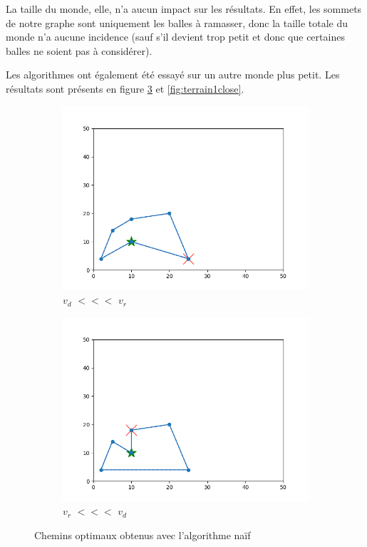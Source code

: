 \documentclass[12pt]{article}
\begin{document}
    \bigskip

    La taille du monde, elle, n'a aucun impact sur les résultats. En effet, les sommets de notre graphe sont uniquement les balles à ramasser, donc la taille totale du monde n'a aucune incidence (sauf s'il devient trop petit et donc que certaines balles ne soient pas à considérer).

    Les algorithmes ont également été essayé sur un autre monde plus petit. Les résultats sont présents en figure \ref{fig:terrain1opt} et \ref{fig:terrain1close}.

    \begin{figure}[H]
      \centering
      \begin{subfigure}{0.35\textwidth}
        \centering
        \includegraphics[width=\linewidth]{img/1od}
        \caption{$v_d$ $<<<$ $v_r$}
        \label{subfig:terrain3mvt}
      \end{subfigure}
      \hfill
      \begin{subfigure}{0.35\textwidth}
        \centering
        \includegraphics[width=\linewidth]{img/1or}
        \caption{$v_r$ $<<<$ $v_d$}
        \label{subfig:terrain3rot}
      \end{subfigure}
      \caption{Chemins optimaux obtenus avec l'algorithme naïf}
      \label{fig:terrain1opt}
    \end{figure}
\end{document}
